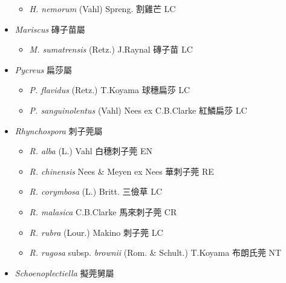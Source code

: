 \begin{itemize}
  \begin{itemize}
        \item[] \textit{H. nemorum} (Vahl) Spreng.  割雞芒   LC
  \end{itemize}
 \item[] \textit{Mariscus} 磚子苗屬
                                
  \begin{itemize}
        \item[] \textit{M. sumatrensis} (Retz.) J.Raynal  磚子苗   LC
  \end{itemize}
 \item[] \textit{Pycreus} 扁莎屬
                                
  \begin{itemize}
        \item[] \textit{P. flavidus} (Retz.) T.Koyama  球穗扁莎   LC
        \item[] \textit{P. sanguinolentus} (Vahl) Nees ex C.B.Clarke  紅鱗扁莎   LC
  \end{itemize}
 \item[] \textit{Rhynchospora} 刺子莞屬
                                
  \begin{itemize}
        \item[] \textit{R. alba} (L.) Vahl  白穗刺子莞   EN
        \item[] \textit{R. chinensis} Nees \& Meyen ex Nees  華刺子莞   RE
        \item[] \textit{R. corymbosa} (L.) Britt.  三儉草   LC
        \item[] \textit{R. malasica} C.B.Clarke  馬來刺子莞   CR
        \item[] \textit{R. rubra} (Lour.) Makino  刺子莞   LC
        \item[] \textit{R. rugosa} subsp. \textit{brownii} (Rom. \& Schult.) T.Koyama  布朗氏莞   NT
  \end{itemize}
 \item[] \textit{Schoenoplectiella} 擬莞舅屬
                                

\end{itemize}
